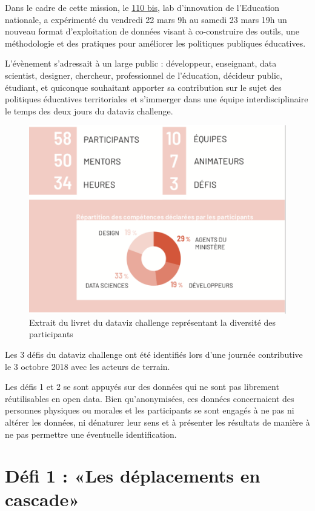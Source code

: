 \documentclass[]{book}
\begin{document}
Dans le cadre de cette mission, le
\href{https://www.education.gouv.fr/110bislab/cid130754/presentation-du-110-bis-lab-d-innovation-de-l-education-nationale.html}{110
bis}, lab d'innovation de l'Education nationale, a expérimenté du
vendredi 22 mars 9h au samedi 23 mars 19h un nouveau format
d'exploitation de données visant à co-construire des outils, une
méthodologie et des pratiques pour améliorer les politiques publiques
éducatives.

L'évènement s'adressait à un large public : développeur, enseignant,
data scientist, designer, chercheur, professionnel de l'éducation,
décideur public, étudiant, et quiconque souhaitant apporter sa
contribution sur le sujet des politiques éducatives territoriales et
s'immerger dans une équipe interdisciplinaire le temps des deux jours du
dataviz challenge.

\begin{figure}

{\centering \includegraphics[width=0.5\linewidth]{./img/participants} 

}

\caption{Extrait du livret du dataviz challenge représentant la diversité des participants}\label{fig:unnamed-chunk-1}
\end{figure}

Les 3 défis du dataviz challenge ont été identifiés lors d'une journée
contributive le 3 octobre 2018 avec les acteurs de terrain.

Les défis 1 et 2 se sont appuyés sur des données qui ne sont pas
librement réutilisables en open data. Bien qu'anonymisées, ces données
concernaient des personnes physiques ou morales et les participants se
sont engagés à ne pas ni altérer les données, ni dénaturer leur sens et
à présenter les résultats de manière à ne pas permettre une éventuelle
identification.

\section{Défi 1 : «Les déplacements en
cascade»}\label{defi-1-les-deplacements-en-cascade}
\end{document}
